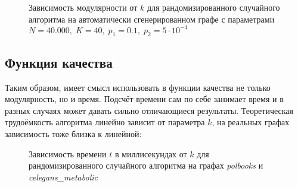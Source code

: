 \begin{figure}[H]
	\caption{Зависимость модулярности от $k$ для рандомизированного случайного алгоритма на автоматически сгенерированном графе с параметрами $N = 40.000,\;K = 40,\;p_1 = 0.1,\;p_2 = 5\cdot 10^{-4}$}
\end{figure}



\subsection{Функция качества}

Таким образом, имеет смысл использовать в функции качества не только модулярность, но и время. Подсчёт времени сам по себе занимает время и в разных случаях может давать сильно отличающиеся результаты. Теоретическая трудоёмкость алгоритма линейно зависит от параметра $k$, на реальных графах зависимость тоже близка к линейной:

\begin{figure}[H]
	\columnwidth
	\caption{Зависимость времени $t$ в миллисекундах от $k$ для рандомизированного случайного алгоритма на графах \emph{polbooks} и \emph{celegans\_metabolic}}
\end{figure}

